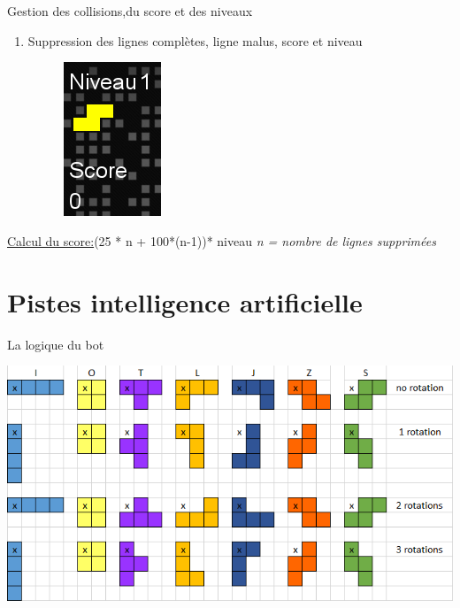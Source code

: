 \documentclass{beamer}
\begin{document}
\begin{frame}{Gestion des collisions,du score et des niveaux}
\begin{enumerate}
\begin{figure}[t]
			\end{figure}
			
			\item Suppression des lignes complètes, ligne malus, score et niveau
			\newline
			
			\begin{figure}[t]
        	
        	\includegraphics[scale=0.3]{images/score_niveau.PNG}
        	
			\end{figure}
			
		\end{enumerate}
		
		\begin{center}
			\underline{Calcul du score:}(25 * n + 100*(n-1))* niveau
			\newline
			\color{blue}
			\textit{n = nombre de lignes supprimées}
			
		\end{center}
		
		
	\end{frame}

\section{Pistes intelligence artificielle}
	
	

	\begin{frame}{La logique du bot}
	
		\includegraphics[scale=0.6]{images/rotation.png}

	\end{frame}
	
\end{document}
